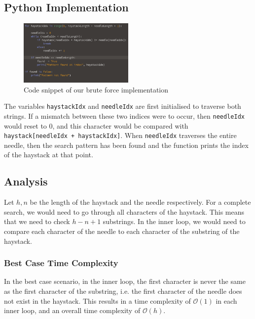 \subsection*{Python Implementation}

\begin{figure}[h!]
    \centering
    \includegraphics[width=0.50\textwidth]{images/brute_force.png}
    \caption{Code snippet of our brute force implementation}
    \label{fig:bf_code}
\end{figure}

\noindent
The variables \texttt{haystackIdx} and \texttt{needleIdx} are first initialised to traverse both strings. If a mismatch between these two indices were to occur, then \texttt{needleIdx} would reset to 0, and this character would be compared with \texttt{haystack[needleIdx + haystackIdx]}. When \texttt{needleIdx} traverses the entire needle, then the search pattern has been found and the function prints the index of the haystack at that point.

\subsection*{Analysis}
Let $h, n$ be the length of the haystack and the needle respectively. For a complete search, we would need to go through all characters of the haystack. This means that we need to check $h - n + 1$ substrings. In the inner loop, we would need to compare each character of the needle to each character of the substring of the haystack.

\subsubsection*{Best Case Time Complexity}
In the best case scenario, in the inner loop, the first character is never the same as the first character of the substring, i.e. the first character of the needle does not exist in the haystack. This results in a time complexity of $\mathcal{O}(1)$ in each inner loop, and an overall time complexity of $\mathcal{O}(h)$.
 
